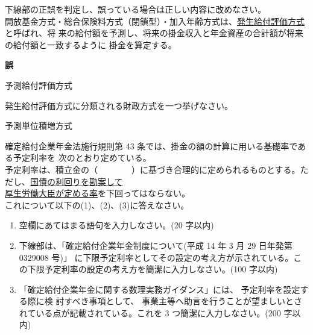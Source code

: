 \begin{truefalse}[年金2 H29 問題1(1)\textcircled{3}]
  下線部の正誤を判定し、誤っている場合は正しい内容に改めなさい。
\\

  開放基金方式・総合保険料方式（閉鎖型）・加入年齢方式は、\underline{発生給付評価方式}と呼ばれ、将
来の給付額を予測し、将来の掛金収入と年金資産の合計額が将来の給付額と一致するように
掛金を算定する。
\end{truefalse}

\begin{answerbox}
  \textbf{誤}

  予測給付評価方式
\end{answerbox}

\begin{shortanswer}[自作 2026/11/7]
  発生給付評価方式に分類される財政方式を一つ挙げなさい。
\end{shortanswer}

\begin{answerbox}
  予測単位積増方式
\end{answerbox}


\begin{shortanswer}[年金2 2025 問題2(5)]
  確定給付企業年金法施行規則第 43 条では、掛金の額の計算に用いる基礎率である予定利率を 次のとおり定めている。
\\

  予定利率は、積立金の（　　　　）に基づき合理的に定められるものとする。ただし、\underline{国債の利回りを勘案して}\\
  \underline{厚生労働大臣が定める率}を下回ってはならない。
\\

これについて以下の(1)、(2)、(3)に答えなさい。

\begin{enumerate}[(1)]
  \item 空欄にあてはまる語句を入力しなさい。(20 字以内)\\
  \item 下線部は、「確定給付企業年金制度について(平成 14 年 3 月 29 日年発第 0329008 号)」
  に下限予定利率としてその設定の考え方が示されている。この下限予定利率の設定の考え方を簡潔に入力しなさい。(100 字以内)\\
  \item 「確定給付企業年金に関する数理実務ガイダンス」には、
  予定利率を設定する際に検 討すべき事項として、
  事業主等へ助言を行うことが望ましいとされている点が記載されている。これを 3 つ簡潔に入力しなさい。(200 字以内)
\end{enumerate}

\end{shortanswer}

